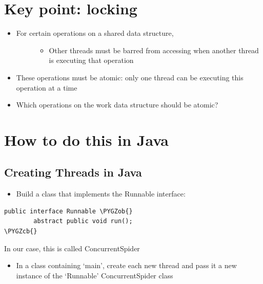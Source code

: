 \documentclass[letterpaper,10pt,openany,oneside]{sphinxmanual}
\def\PYGZob{\char`\{}
\def\PYGZcb{\char`\}}
\begin{document}
\section{Key point: locking}
\label{URLSpider/URLSpider:key-point-locking}\begin{itemize}
\item {} \begin{description}
\item[{For certain operations on a shared data structure,}] \leavevmode\begin{itemize}
\item {} 
Other threads must be barred from accessing when another thread is executing that operation

\end{itemize}

\end{description}

\item {} 
These operations must be atomic: only one thread can be executing this operation at a time

\item {} 
Which operations on the work data structure should be atomic?

\end{itemize}


\section{How to do this in Java}
\label{URLSpider/URLSpider:how-to-do-this-in-java}

\subsection{Creating Threads in Java}
\label{URLSpider/URLSpider:creating-threads-in-java}\begin{itemize}
\item {} 
Build a class that implements the Runnable interface:

\end{itemize}

\begin{Verbatim}[commandchars=\\\{\}]
public interface Runnable \PYGZob{}
        abstract public void run();
\PYGZcb{}
\end{Verbatim}

In our case, this is called ConcurrentSpider
\begin{itemize}
\item {} 
In a class containing ‘main’, create each new thread and pass it a new instance of the `Runnable' ConcurrentSpider class

\end{itemize}
\end{document}
